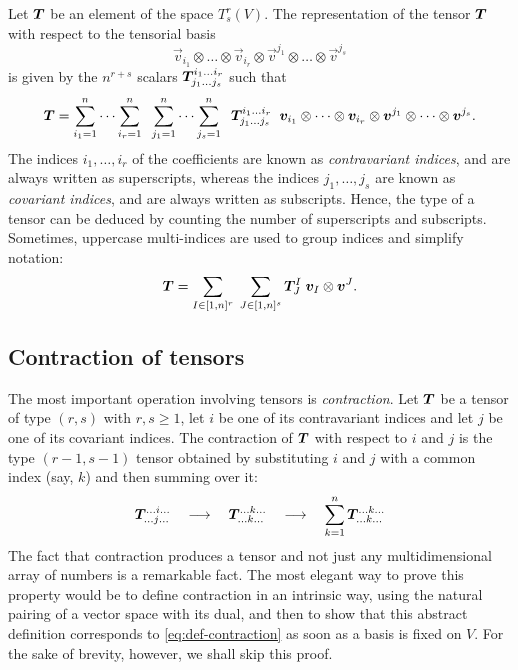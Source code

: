 Let $\bm{T}$ be an element of the space $T_s^r(V)$.
The representation of the tensor $\bm{T}$ with respect to the
tensorial basis
\[
\vec{v}_{i_1} \otimes \dots \otimes \vec{v}_{i_r}
\otimes
\vec{v}^{j_1} \otimes \dots \otimes \vec{v}^{j_s}
\]
is given by the $n^{r+s}$ scalars $\bm{T}^{i_1 \dots i_r}_{j_1 \dots j_s}$
such that
\[
\bm{T} = \sum_{i_1=1}^n \dots \sum_{i_r=1}^n \;\;
\sum_{j_1=1}^n \dots \sum_{j_s=1}^n \;\;
\bm{T}^{i_1 \dots i_r}_{j_1 \dots j_s} \;\;
\bm{v}_{i_1} \otimes \dots \otimes \bm{v}_{i_r}
\otimes
\bm{v}^{j_1} \otimes \dots \otimes \bm{v}^{j_s}.
\]
The indices $i_1, \dots, i_r$ of the coefficients are known as
\emph{contravariant indices}, and are always written as superscripts,
whereas the indices $j_1, \dots, j_s$ are known as \emph{covariant indices},
and are always written as subscripts.
Hence, the type of a tensor can be deduced by counting the number
of superscripts and subscripts. Sometimes, uppercase multi-indices are
used to group indices and simplify notation:
\[
\bm{T} = \sum_{I \in [1,n]^r} \; \sum_{J \in [1,n]^s}
\bm{T}^I_J \; \bm{v}_I \otimes \bm{v}^J.
\]

\subsection*{Contraction of tensors}

The most important operation involving tensors is \emph{contraction}.
Let $\bm{T}$ be a tensor of type $(r,s)$ with $r,s \geq 1$, let
$i$ be one of its contravariant indices and let $j$ be one of its
covariant indices.
The contraction of $\bm{T}$ with respect to $i$ and $j$ is the
type $(r-1,s-1)$ tensor obtained by substituting $i$ and $j$ with
a common index (say, $k$) and then summing over it:
\begin{equation} \label{eq:def-contraction}
\bm{T}^{\dots i \dots}_{\dots j \dots}
\quad \longrightarrow \quad
\bm{T}^{\dots k \dots}_{\dots k \dots}
\quad \longrightarrow \quad
\sum_{k=1}^n \bm{T}^{\dots k \dots}_{\dots k \dots}
\end{equation}
The fact that contraction produces a tensor and not just any multidimensional
array of numbers is a remarkable fact. The most elegant way to prove
this property would be to define contraction in an intrinsic way, using the
natural pairing of a vector space with its dual, and then to show
that this abstract definition corresponds to \eqref{eq:def-contraction}
as soon as a basis is fixed on $V$. For the sake of brevity, however,
we shall skip this proof.

